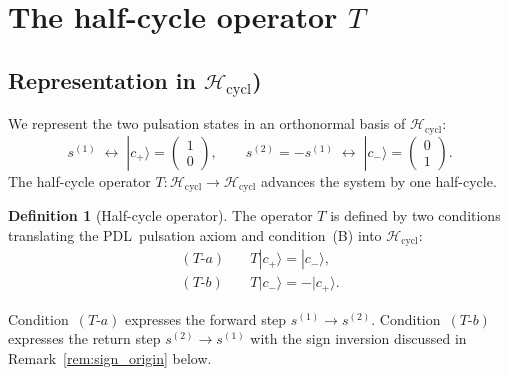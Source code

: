 \documentclass[11pt,a4paper]{article}
\theoremstyle{definition}
\newtheorem{definition}[theorem]{Definition}
\newcommand{\PDL}{\textnormal{PDL}}
\newcommand{\Hcycl}{\mathcal{H}_{\mathrm{cycl}}}
\newcommand{\cplu}{|c_+\rangle}
\newcommand{\cmin}{|c_-\rangle}
\begin{document}
\section{The half-cycle operator \texorpdfstring{$T$}{T}}
\label{sec:T}

\subsection{Representation in \texorpdfstring{$\Hcycl$}{Hcycl})}

We represent the two pulsation states in an orthonormal basis of $\Hcycl$:
\begin{equation}
s^{(1)} \;\longleftrightarrow\; \cplu = \begin{pmatrix}1\\0\end{pmatrix}, \qquad s^{(2)} = -s^{(1)} \;\longleftrightarrow\; \cmin = \begin{pmatrix}0\\1\end{pmatrix}.
\label{eq:basis}
\end{equation}
The half-cycle operator $T : \Hcycl \to \Hcycl$ advances the system by one half-cycle.

\begin{definition}[Half-cycle operator]
\label{def:T}
The operator $T$ is defined by two conditions translating the \PDL\ pulsation axiom and condition~(B) into $\Hcycl$:
\begin{align}
(T\textrm{-}a)& \quad T\cplu = \cmin, \label{eq:Ta} \\
(T\textrm{-}b)& \quad T\cmin = -\cplu. \label{eq:Tb}
\end{align}
\end{definition}

Condition~$(T\textrm{-}a)$ expresses the forward step $s^{(1)} \to s^{(2)}$. Condition~$(T\textrm{-}b)$ expresses the return step $s^{(2)} \to s^{(1)}$ with the sign inversion discussed in Remark~\ref{rem:sign_origin} below.
\end{document}
